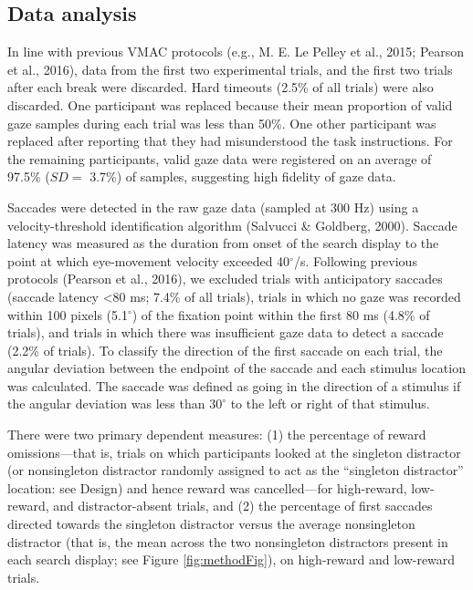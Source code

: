 \documentclass[jou, a4paper, noextraspace,floatsintext]{apa6}
\theoremstyle{definition}
\theoremstyle{definition}
\theoremstyle{definition}
\theoremstyle{remark}
\begin{document}
\subsection{Data analysis}\label{data-analysis}

In line with previous VMAC protocols (e.g., M. E. Le Pelley et al.,
2015; Pearson et al., 2016), data from the first two experimental
trials, and the first two trials after each break were discarded. Hard
timeouts (2.5\% of all trials) were also discarded. One participant was
replaced because their mean proportion of valid gaze samples during each
trial was less than 50\%. One other participant was replaced after
reporting that they had misunderstood the task instructions. For the
remaining participants, valid gaze data were registered on an average of
97.5\% (\(SD=\) 3.7\%) of samples, suggesting high fidelity of gaze
data.

Saccades were detected in the raw gaze data (sampled at 300 Hz) using a
velocity-threshold identification algorithm (Salvucci \& Goldberg,
2000). Saccade latency was measured as the duration from onset of the
search display to the point at which eye-movement velocity exceeded
40\(^\circ\)/s. Following previous protocols (Pearson et al., 2016), we
excluded trials with anticipatory saccades (saccade latency
\textless{}80 ms; 7.4\% of all trials), trials in which no gaze was
recorded within 100 pixels (5.1\(^\circ\)) of the fixation point within
the first 80 ms (4.8\% of trials), and trials in which there was
insufficient gaze data to detect a saccade (2.2\% of trials). To
classify the direction of the first saccade on each trial, the angular
deviation between the endpoint of the saccade and each stimulus location
was calculated. The saccade was defined as going in the direction of a
stimulus if the angular deviation was less than \(30^\circ\) to the left
or right of that stimulus.

There were two primary dependent measures: (1) the percentage of reward
omissions---that is, trials on which participants looked at the
singleton distractor (or nonsingleton distractor randomly assigned to
act as the \enquote{singleton distractor} location: see Design) and
hence reward was cancelled---for high-reward, low-reward, and
distractor-absent trials, and (2) the percentage of first saccades
directed towards the singleton distractor versus the average
nonsingleton distractor (that is, the mean across the two nonsingleton
distractors present in each search display; see Figure
\ref{fig:methodFig}), on high-reward and low-reward trials.
\end{document}
